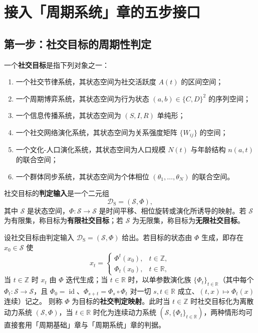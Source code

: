 \section{接入「周期系统」章的五步接口}
\label{sec:social_five_steps}

\subsection{第一步：社交目标的周期性判定}

\begin{definition}[社交目标与判定输入]\label{def:social_target}
一个\textbf{社交目标}是指下列对象之一：
\begin{enumerate}[label=(\roman*)]
    \item 一个社交节律系统，其状态空间为社交活跃度 $A(t)$ 的区间空间；
    \item 一个周期博弈系统，其状态空间为行为状态 $(a,b)\in\{C,D\}^2$ 的序列空间；
    \item 一个信息传播系统，其状态空间为 $(S,I,R)$ 单纯形；
    \item 一个社交网络演化系统，其状态空间为关系强度矩阵 $\{W_{ij}\}$ 的空间；
    \item 一个文化-人口演化系统，其状态空间为人口规模 $N(t)$ 与年龄结构 $n(a,t)$ 的联合空间；
    \item 一个群体同步系统，其状态空间为个体相位 $(\theta_1,\dots,\theta_N)$ 的联合空间。
\end{enumerate}
社交目标的\textbf{判定输入}是一个二元组
\[
\mathcal D_{\mathrm{S}}=(\mathcal S,\Phi),
\]
其中 $\mathcal S$ 是状态空间，$\Phi:\mathcal S\to\mathcal S$ 是时间平移、相位旋转或演化所诱导的映射。若 $\mathcal S$ 为有限集，称目标为\textbf{有限社交目标}；若 $\mathcal S$ 为无限集，称目标为\textbf{无限社交目标}。
\end{definition}

\begin{definition}[社交判定映射]\label{def:social_periodization}
设社交目标由判定输入 $\mathcal D_{\mathrm{S}}=(\mathcal S,\Phi)$ 给出。若目标的状态由 $\Phi$ 生成，即存在 $x_0\in\mathcal S$ 使
\[
x_t=\begin{cases}\Phi^t(x_0), & t\in\mathbb Z,\\ \Phi_t(x_0), & t\in\mathbb R,\end{cases}
\]
当 $t\in\mathbb Z$ 时 $x_t$ 由 $\Phi$ 迭代生成；当 $t\in\mathbb R$ 时，以单参数演化族 $\{\Phi_t\}_{t\in\mathbb R}$（其中每个 $\Phi_t:\mathcal S\to\mathcal S$，且 $\Phi_0=\operatorname{id}$、$\Phi_{s+t}=\Phi_s\circ\Phi_t$ 对一切 $s,t\in\mathbb R$ 成立、$(t,x)\mapsto\Phi_t(x)$ 连续）记之。
则称 $\Phi$ 为目标的\textbf{社交判定映射}。此时当 $t\in\mathbb Z$ 时社交目标化为离散动力系统 $(\mathcal S,\Phi)$，当 $t\in\mathbb R$ 时化为连续动力系统 $(\mathcal S,\{\Phi_t\}_{t\in\mathbb R})$，两种情形均可直接套用「周期基础」章与「周期系统」章的判据。
\end{definition}

